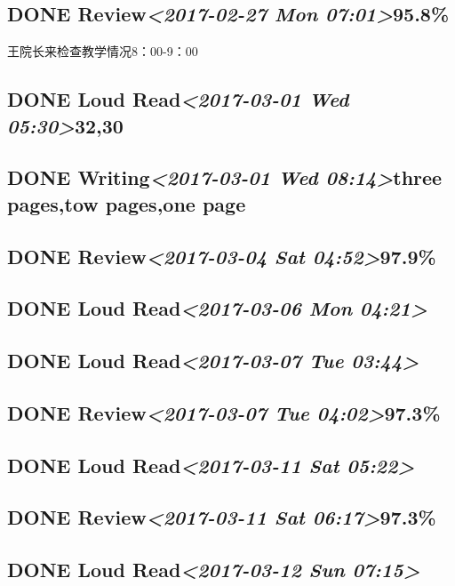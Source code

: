 \documentclass[11pt]{ctexart}
\begin{document}
\subsection{{\bfseries\sffamily DONE} Review\textit{<2017-02-27 Mon 07:01>}95.8\%}
\label{sec:org6d5aacc}
王院长来检查教学情况8：00-9：00
\subsection{{\bfseries\sffamily DONE} Loud Read\textit{<2017-03-01 Wed 05:30>}32,30}
\label{sec:org13e4407}
\subsection{{\bfseries\sffamily DONE} Writing\textit{<2017-03-01 Wed 08:14>}three pages,tow pages,one page}
\label{sec:org5fbae54}
\subsection{{\bfseries\sffamily DONE} Review\textit{<2017-03-04 Sat 04:52>}97.9\%}
\label{sec:org1c017c4}
\subsection{{\bfseries\sffamily DONE} Loud Read\textit{<2017-03-06 Mon 04:21>}}
\label{sec:org350e6d5}
\subsection{{\bfseries\sffamily DONE} Loud Read\textit{<2017-03-07 Tue 03:44>}}
\label{sec:org93849ca}
\subsection{{\bfseries\sffamily DONE} Review\textit{<2017-03-07 Tue 04:02>}97.3\%}
\label{sec:org27aacfd}
\subsection{{\bfseries\sffamily DONE} Loud Read\textit{<2017-03-11 Sat 05:22>}}
\label{sec:org48e1392}
\subsection{{\bfseries\sffamily DONE} Review\textit{<2017-03-11 Sat 06:17>}97.3\%}
\label{sec:orgeee85f5}
\subsection{{\bfseries\sffamily DONE} Loud Read\textit{<2017-03-12 Sun 07:15>}}
\label{sec:orgfd0ca70}
\end{document}
